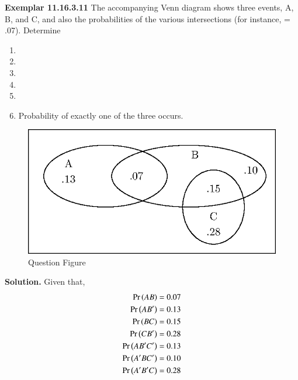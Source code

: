 \documentclass[journal,12pt,twocolumn]{IEEEtran}
\begin{document}
\bigskip
\renewcommand{\thefigure}{\theenumi}
\renewcommand{\thetable}{\theenumi}
\textbf{Exemplar 11.16.3.11}
The accompanying Venn diagram shows three events, A, B, and C, and also the probabilities of the various intersections (for instance,  = .07). Determine
\begin{enumerate}[label=(\alph*)]
\item 
{}
\item 
{}
\item 
{}
\item 
{}
\item 
{}
\item 
Probability of exactly one
of the three occurs.
\end{enumerate}
\begin{enumerate}
\begin{figure}[h!]
\includegraphics[width=\columnwidth]{figs/new-figure0}
\caption{Question Figure}
\label{fig}
\end{figure}
\end{enumerate}
\textbf{Solution.}
Given that,
    \begin{align}
    \label{eq:1}
        \Pr\left(AB\right)=0.07\\
        \label{eq:2}
        \Pr\left(AB^\prime\right)=0.13\\
        \label{eq:4}
        \Pr\left(BC\right) = 0.15\\
        \Pr\left(CB^\prime\right) = 0.28\\
        \label{eq:6}
        \Pr\left(AB^\prime C^\prime\right) = 0.13\\
        \label{eq:5}
        \Pr\left(A^\prime B C^\prime\right) =0.10\\
        \label{eq:7}
        \Pr\left(A^\prime B^\prime C\right) =0.28
    \end{align}
\end{document}

